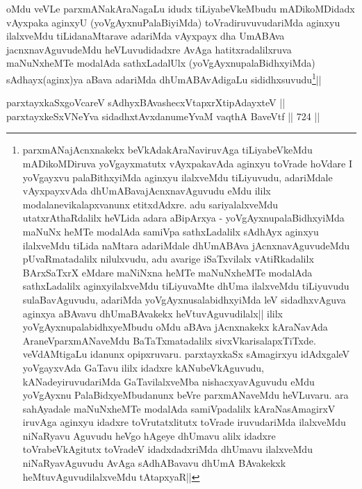 \begin{artha}
oMdu veVLe parxmANakAraNagaLu idudx tiLiyabeVkeMbudu mADikoMDidadx vAyxpaka aginxyU (yoVgAyxnuPalaBiyiMda) toVradiruvuvudariMda aginxyu ilalxveMdu tiLidanaMtarave adariMda vAyxpayx dha UmABAva jacnxnavAguvudeMdu heVLuvudidadxre AvAga hatitxradalilxruva maNuNxheMTe modalAda sathxLadalUlx (yoVgAyxnupalaBidhxyiMda) sAdhayx(aginx)ya aBava adariMda dhUmABAvAdigaLu sididhxsuvudu\footnote{parxmANajAcnxnakekx beVkAdakAraNaviruvAga tiLiyabeVkeMdu mADikoMDiruva yoVgayxmatutx vAyxpakavAda aginxyu toVrade hoVdare I yoVgayxvu palaBithxyiMda aginxyu ilalxveMdu tiLiyuvudu, adariMdale vAyxpayxvAda dhUmABavajAcnxnavAguvudu eMdu ililx modalanevikalapxvanunx etitxdAdxre. adu sariyalalxveMdu utatxrAthaRdalilx heVLida adara aBipArxya - yoVgAyxnupalaBidhxyiMda maNuNx heMTe modalAda samiVpa sathxLadalilx sAdhAyx aginxyu ilalxveMdu tiLida naMtara adariMdale dhUmABAva jAcnxnavAguvudeMdu pUvaRmatadalilx nilulxvudu, adu avarige iSaTxvilalx vAtiRkadalilx BArxSaTxrX eMdare maNiNxna heMTe maNuNxheMTe modalAda sathxLadalilx aginxyilalxveMdu tiLiyuvaMte dhUma ilalxveMdu tiLiyuvudu sulaBavAguvudu, adariMda yoVgAyxnusalabidhxyiMda leV sidadhxvAguva aginxya aBAvavu dhUmaBAvakekx heVtuvAguvudilalx||
ililx yoVgAyxnupalabidhxyeMbudu oMdu aBAva jAcnxnakekx kAraNavAda AraneVparxmANaveMdu BaTaTxmatadalilx sivxVkarisalapxTiTxde. veVdAMtigaLu idanunx opipxruvaru. parxtayxkaSx sAmagirxyu idAdxgaleV yoVgayxvAda GaTavu ililx idadxre kANubeVkAguvudu, kANadeyiruvudariMda GaTavilalxveMba nishacxyavAguvudu eMdu yoVgAyxnu PalaBidxyeMbudanunx beVre parxmANaveMdu heVLuvaru. ara sahAyadale maNuNxheMTe modalAda samiVpadalilx kAraNasAmagirxV iruvAga aginxyu idadxre toVrutatxlitutx toVrade iruvudariMda ilalxveMdu niNaRyavu Aguvudu heVgo hAgeye dhUmavu alilx idadxre toVrabeVkAgitutx  toVradeV idadxdadxriMda dhUmavu  ilalxveMdu niNaRyavAguvudu AvAga sAdhABavavu dhUmA BAvakekxk heMtuvAguvudilalxveMdu tAtapxyaR||
}||
\end{artha}


\begin{shl}
parxtayxkaSxgoVcareV sAdhyxBAvashecxVtapxrXtipAdayxteV || \\
parxtayxkeSxVNeYva sidadhxtAvxdanumeYvaM vaqthA BaveVtf ||  724 ||  
\end{shl}

